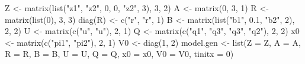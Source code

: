 \begin{Schunk}
\begin{Sinput}
 Z <- matrix(list("z1", "z2", 0, 0, "z2", 3), 3, 2)
 A <- matrix(0, 3, 1)
 R <- matrix(list(0), 3, 3)
 diag(R) <- c("r", "r", 1)
 B <- matrix(list("b1", 0.1, "b2", 2), 2, 2)
 U <- matrix(c("u", "u"), 2, 1)
 Q <- matrix(c("q1", "q3", "q3", "q2"), 2, 2)
 x0 <- matrix(c("pi1", "pi2"), 2, 1)
 V0 <- diag(1, 2)
 model.gen <- list(Z = Z, A = A, R = R, B = B, U = U, 
                   Q = Q, x0 = x0, V0 = V0, tinitx = 0)
\end{Sinput}
\end{Schunk}
